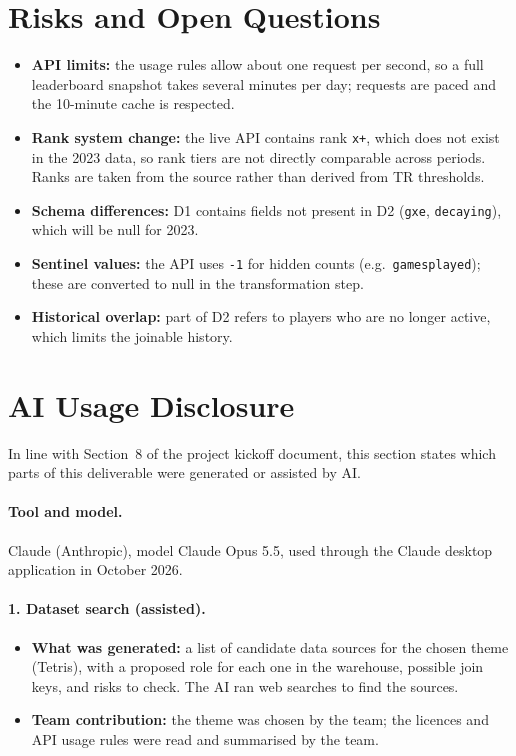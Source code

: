 \documentclass[11pt,a4paper]{article}
\begin{document}
\section{Risks and Open Questions}
\begin{itemize}
  \item \textbf{API limits:} the usage rules allow about one request per
        second, so a full leaderboard snapshot takes several minutes per
        day; requests are paced and the 10-minute cache is respected.
  \item \textbf{Rank system change:} the live API contains rank
        \texttt{x+}, which does not exist in the 2023 data, so rank tiers
        are not directly comparable across periods. Ranks are taken from
        the source rather than derived from TR thresholds.
  \item \textbf{Schema differences:} D1 contains fields not present in D2
        (\texttt{gxe}, \texttt{decaying}), which will be null for 2023.
  \item \textbf{Sentinel values:} the API uses \texttt{-1} for hidden
        counts (e.g.\ \texttt{gamesplayed}); these are converted to null in
        the transformation step.
  \item \textbf{Historical overlap:} part of D2 refers to players who are
        no longer active, which limits the joinable history.
\end{itemize}

\section*{AI Usage Disclosure}

In line with Section~8 of the project kickoff document, this section states
which parts of this deliverable were generated or assisted by AI.

\paragraph{Tool and model.}
Claude (Anthropic), model Claude Opus 5.5, used through the Claude desktop
application in October 2026.

\paragraph{1. Dataset search (assisted).}
\begin{itemize}
  \item \textbf{What was generated:} a list of candidate data sources for
        the chosen theme (Tetris), with a proposed role for each one in the
        warehouse, possible join keys, and risks to check. The AI ran web
        searches to find the sources.
  \item \textbf{Team contribution:} the theme was chosen by the team; the
        licences and API usage rules were read and summarised by the team.
\end{itemize}
\end{document}
